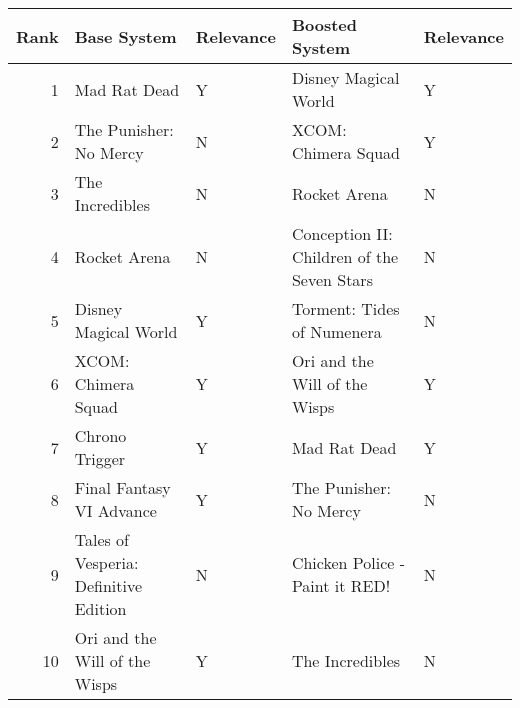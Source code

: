 \begin{tabular}{rllll}
\toprule
Rank & Base System & Relevance & Boosted System & Relevance \\
\midrule
1 & Mad Rat Dead & Y & Disney Magical World & Y \\
2 & The Punisher: No Mercy & N & XCOM: Chimera Squad & Y \\
3 & The Incredibles & N & Rocket Arena & N \\
4 & Rocket Arena & N & Conception II: Children of the Seven Stars & N \\
5 & Disney Magical World & Y & Torment: Tides of Numenera & N \\
6 & XCOM: Chimera Squad & Y & Ori and the Will of the Wisps & Y \\
7 & Chrono Trigger & Y & Mad Rat Dead & Y \\
8 & Final Fantasy VI Advance & Y & The Punisher: No Mercy & N \\
9 & Tales of Vesperia: Definitive Edition & N & Chicken Police - Paint it RED! & N \\
10 & Ori and the Will of the Wisps & Y & The Incredibles & N \\
\bottomrule
\end{tabular}
